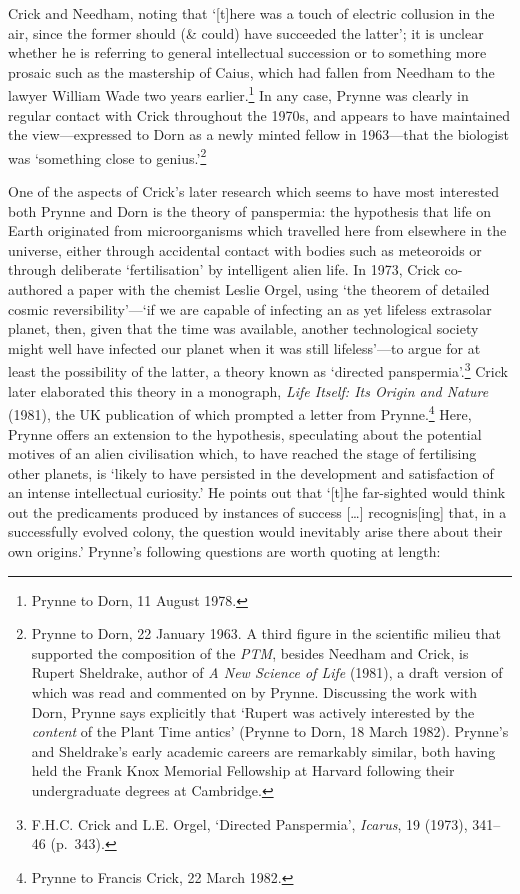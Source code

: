 \documentclass[]{article}
\begin{document}
Crick and Needham, noting that ‘{[}t{]}here was a touch of electric
collusion in the air, since the former should (\& could) have succeeded
the latter’; it is unclear whether he is referring to general
intellectual succession or to something more prosaic such as the
mastership of Caius, which had fallen from Needham to the lawyer William
Wade two years earlier.\footnote{Prynne to Dorn, 11 August 1978.} In any
case, Prynne was clearly in regular contact with Crick throughout the
1970s, and appears to have maintained the view—expressed to Dorn as a
newly minted fellow in 1963—that the biologist was ‘something close to
genius.’\footnote{Prynne to Dorn, 22 January 1963. A third figure in the
  scientific milieu that supported the composition of the \emph{PTM},
  besides Needham and Crick, is Rupert Sheldrake, author of \emph{A New
  Science of Life} (1981), a draft version of which was read and
  commented on by Prynne. Discussing the work with Dorn, Prynne says
  explicitly that ‘Rupert was actively interested by the \emph{content}
  of the Plant Time antics’ (Prynne to Dorn, 18 March 1982). Prynne’s
  and Sheldrake’s early academic careers are remarkably similar, both
  having held the Frank Knox Memorial Fellowship at Harvard following
  their undergraduate degrees at Cambridge.}

One of the aspects of Crick’s later research which seems to have most
interested both Prynne and Dorn is the theory of panspermia: the
hypothesis that life on Earth originated from microorganisms which
travelled here from elsewhere in the universe, either through accidental
contact with bodies such as meteoroids or through deliberate
‘fertilisation’ by intelligent alien life. In 1973, Crick co-authored a
paper with the chemist Leslie Orgel, using ‘the theorem of detailed
cosmic reversibility’—‘if we are capable of infecting an as yet lifeless
extrasolar planet, then, given that the time was available, another
technological society might well have infected our planet when it was
still lifeless’—to argue for at least the possibility of the latter, a
theory known as ‘directed panspermia’.\footnote{F.H.C. Crick and L.E.
  Orgel, ‘Directed Panspermia’, \emph{Icarus}, 19 (1973), 341–46
  (p.~343).} Crick later elaborated this theory in a monograph,
\emph{Life Itself: Its Origin and Nature} (1981), the UK publication of
which prompted a letter from Prynne.\footnote{Prynne to Francis Crick,
  22 March 1982.} Here, Prynne offers an extension to the hypothesis,
speculating about the potential motives of an alien civilisation which,
to have reached the stage of fertilising other planets, is ‘likely to
have persisted in the development and satisfaction of an intense
intellectual curiosity.’ He points out that ‘{[}t{]}he far-sighted would
think out the predicaments produced by instances of success
{[}\ldots{}{]} recognis{[}ing{]} that, in a successfully evolved colony,
the question would inevitably arise there about their own origins.’
Prynne’s following questions are worth quoting at length:
\end{document}
